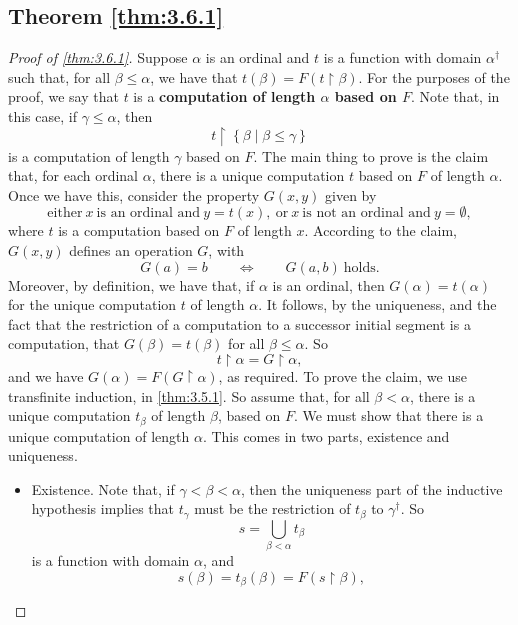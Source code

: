 \documentclass{article}
\newcommand{\rb}[1]{\left( #1 \right)}
\newcommand{\cb}[1]{\left\{ #1 \right\}}
\theoremstyle{definition}\newtheorem{definition}{Definition}[subsection]
\theoremstyle{definition}\newtheorem{remark1}[definition]{Remark}
\theoremstyle{definition}\newtheorem{example1}[definition]{Example}
\theoremstyle{definition}\newtheorem*{remark2}{Remark}
\theoremstyle{definition}\newtheorem*{example2}{Example}
\theoremstyle{definition}\newtheorem*{note}{Note}
\theoremstyle{definition}\newtheorem*{notation}{Notation}
\begin{document}
\pagebreak

\subsection{Theorem \ref{thm:3.6.1}}

\begin{proof}[Proof of \ref{thm:3.6.1}]
Suppose $ \alpha $ is an ordinal and $ t $ is a function with domain $ \alpha^\dagger $ such that, for all $ \beta \le \alpha $, we have that $ t\rb{\beta} = F\rb{t \upharpoonright \beta} $. For the purposes of the proof, we say that $ t $ is a \textbf{computation of length $ \alpha $ based on $ F $}. Note that, in this case, if $ \gamma \le \alpha $, then
$$ t \upharpoonright \cb{\beta \mid \beta \le \gamma} $$
is a computation of length $ \gamma $ based on $ F $. The main thing to prove is the claim that, for each ordinal $ \alpha $, there is a unique computation $ t $ based on $ F $ of length $ \alpha $. Once we have this, consider the property $ G\rb{x, y} $ given by
$$ \text{either} \ x \ \text{is an ordinal and} \ y = t\rb{x}, \ \text{or} \ x \ \text{is not an ordinal and} \ y = \emptyset, $$
where $ t $ is a computation based on $ F $ of length $ x $. According to the claim, $ G\rb{x, y} $ defines an operation $ G $, with
$$ G\rb{a} = b \qquad \iff \qquad G\rb{a, b} \ \text{holds}. $$
Moreover, by definition, we have that, if $ \alpha $ is an ordinal, then $ G\rb{\alpha} = t\rb{\alpha} $ for the unique computation $ t $ of length $ \alpha $. It follows, by the uniqueness, and the fact that the restriction of a computation to a successor initial segment is a computation, that $ G\rb{\beta} = t\rb{\beta} $ for all $ \beta \le \alpha $. So
$$ t \upharpoonright \alpha = G \upharpoonright \alpha, $$
and we have $ G\rb{\alpha} = F\rb{G \upharpoonright \alpha} $, as required. To prove the claim, we use transfinite induction, in \ref{thm:3.5.1}. So assume that, for all $ \beta < \alpha $, there is a unique computation $ t_\beta $ of length $ \beta $, based on $ F $. We must show that there is a unique computation of length $ \alpha $. This comes in two parts, existence and uniqueness.
\begin{itemize}
\item Existence. Note that, if $ \gamma < \beta < \alpha $, then the uniqueness part of the inductive hypothesis implies that $ t_\gamma $ must be the restriction of $ t_\beta $ to $ \gamma^\dagger $. So
$$ s = \bigcup_{\beta < \alpha} t_\beta $$
is a function with domain $ \alpha $, and
$$ s\rb{\beta} = t_\beta\rb{\beta} = F\rb{s \upharpoonright \beta}, $$

\end{itemize}
\end{proof}
\end{document}
